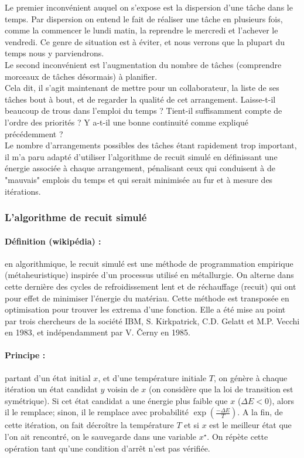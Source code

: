 \documentclass[12pt]{article}
\begin{document}
Le premier inconvénient auquel on s'expose est la dispersion d'une tâche dans le temps. Par dispersion on entend le fait de réaliser une tâche en plusieurs fois, comme la commencer le lundi matin, la reprendre le mercredi et l'achever le vendredi. Ce genre de situation est à éviter, et nous verrons que la plupart du temps nous y parviendrons.\\

Le second inconvénient est l'augmentation du nombre de tâches (comprendre morceaux de tâches désormais) à planifier.\\


Cela dit, il s'agit maintenant de mettre pour un collaborateur, la liste de ses tâches bout à bout, et de regarder la qualité de cet arrangement. Laisse-t-il beaucoup de trous dans l'emploi du temps ? Tient-il suffisamment compte de l'ordre des priorités ? Y a-t-il une bonne continuité comme expliqué précédemment ?\\

Le nombre d'arrangements possibles des tâches étant rapidement trop important, il m'a paru adapté d'utiliser l'algorithme de recuit simulé en définissant une énergie associée à chaque arrangement, pénalisant ceux qui conduisent à de "mauvais" emplois du temps et qui serait minimisée au fur et à mesure des itérations.
\subsubsection{L'algorithme de recuit simulé}
\paragraph{Définition (wikipédia) :} en algorithmique, le recuit simulé est une méthode de programmation empirique (métaheuristique) inspirée d'un processus utilisé en métallurgie. On alterne dans cette dernière des cycles de refroidissement lent et de réchauffage (recuit) qui ont pour effet de minimiser l'énergie du matériau. Cette méthode est transposée en optimisation pour trouver les extrema d'une fonction. Elle a été mise au point par trois chercheurs de la société IBM, S. Kirkpatrick, C.D. Gelatt et M.P. Vecchi en 1983, et indépendamment par V. Černy en 1985. \par



\paragraph{Principe :} partant d'un état initial $x$, et d'une température initiale $T$, on génère à chaque itération un état candidat $y$ voisin de $x$ (on considère que la loi de transition est symétrique). Si cet état candidat a une énergie plus faible que $x$ ($\Delta E < 0$), alors il le remplace; sinon, il le remplace avec probabilité $\exp\left(\frac{-\Delta E}{T} \right)$. A la fin, de cette itération, on fait décroître la température $T$ et si $x$ est le meilleur état que l'on ait rencontré, on le sauvegarde dans une variable $x^{\star}$. On répète cette opération tant qu'une condition d'arrêt n'est pas vérifiée. \par
\end{document}
